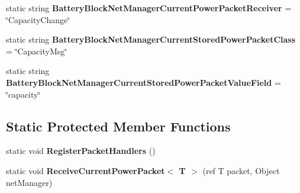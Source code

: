 \begin{DoxyCompactItemize}
\item 
\hypertarget{class_s_e_mod_a_p_i_internal_1_1_a_p_i_1_1_entity_1_1_sector_1_1_sector_object_1_1_cube_grid_1_1d727a14220007a281c99a2418d07055f_a09f9ca836ec618fbf28829ae2c46dac0}{}static string {\bfseries Battery\+Block\+Net\+Manager\+Current\+Power\+Packet\+Receiver} = \char`\"{}Capacity\+Change\char`\"{}\label{class_s_e_mod_a_p_i_internal_1_1_a_p_i_1_1_entity_1_1_sector_1_1_sector_object_1_1_cube_grid_1_1d727a14220007a281c99a2418d07055f_a09f9ca836ec618fbf28829ae2c46dac0}

\item 
\hypertarget{class_s_e_mod_a_p_i_internal_1_1_a_p_i_1_1_entity_1_1_sector_1_1_sector_object_1_1_cube_grid_1_1d727a14220007a281c99a2418d07055f_a85c4279da77a4bfbb770b5a4c0685344}{}static string {\bfseries Battery\+Block\+Net\+Manager\+Current\+Stored\+Power\+Packet\+Class} = \char`\"{}Capacity\+Msg\char`\"{}\label{class_s_e_mod_a_p_i_internal_1_1_a_p_i_1_1_entity_1_1_sector_1_1_sector_object_1_1_cube_grid_1_1d727a14220007a281c99a2418d07055f_a85c4279da77a4bfbb770b5a4c0685344}

\item 
\hypertarget{class_s_e_mod_a_p_i_internal_1_1_a_p_i_1_1_entity_1_1_sector_1_1_sector_object_1_1_cube_grid_1_1d727a14220007a281c99a2418d07055f_abf507b6ab61df120153bd620f31fa851}{}static string {\bfseries Battery\+Block\+Net\+Manager\+Current\+Stored\+Power\+Packet\+Value\+Field} = \char`\"{}capacity\char`\"{}\label{class_s_e_mod_a_p_i_internal_1_1_a_p_i_1_1_entity_1_1_sector_1_1_sector_object_1_1_cube_grid_1_1d727a14220007a281c99a2418d07055f_abf507b6ab61df120153bd620f31fa851}

\end{DoxyCompactItemize}
\subsection*{Static Protected Member Functions}
\begin{DoxyCompactItemize}
\item 
\hypertarget{class_s_e_mod_a_p_i_internal_1_1_a_p_i_1_1_entity_1_1_sector_1_1_sector_object_1_1_cube_grid_1_1d727a14220007a281c99a2418d07055f_abc115ade0d485a27187f7a6f6b2d64ad}{}static void {\bfseries Register\+Packet\+Handlers} ()\label{class_s_e_mod_a_p_i_internal_1_1_a_p_i_1_1_entity_1_1_sector_1_1_sector_object_1_1_cube_grid_1_1d727a14220007a281c99a2418d07055f_abc115ade0d485a27187f7a6f6b2d64ad}

\item 
\hypertarget{class_s_e_mod_a_p_i_internal_1_1_a_p_i_1_1_entity_1_1_sector_1_1_sector_object_1_1_cube_grid_1_1d727a14220007a281c99a2418d07055f_af5c1bb6f635448ecf03e814b89fe7d19}{}static void {\bfseries Receive\+Current\+Power\+Packet$<$ T $>$} (ref T packet, Object net\+Manager)\label{class_s_e_mod_a_p_i_internal_1_1_a_p_i_1_1_entity_1_1_sector_1_1_sector_object_1_1_cube_grid_1_1d727a14220007a281c99a2418d07055f_af5c1bb6f635448ecf03e814b89fe7d19}

\end{DoxyCompactItemize}
